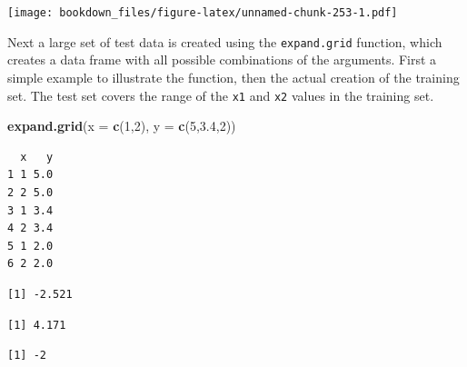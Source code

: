 \documentclass[
]{krantz}
\makeatletter
\newenvironment{Shaded}{\begin{snugshade}}{\end{snugshade}}
\newcommand{\DataTypeTok}[1]{\textcolor[rgb]{0.27,0.27,0.27}{#1}}
\newcommand{\DecValTok}[1]{\textcolor[rgb]{0.06,0.06,0.06}{#1}}
\newcommand{\FloatTok}[1]{\textcolor[rgb]{0.06,0.06,0.06}{#1}}
\newcommand{\KeywordTok}[1]{\textcolor[rgb]{0.27,0.27,0.27}{\textbf{#1}}}
\newcommand{\NormalTok}[1]{#1}
\newcommand{\OperatorTok}[1]{\textcolor[rgb]{0.43,0.43,0.43}{\textbf{#1}}}
\newenvironment{kframe}{%
\medskip{}
\setlength{\fboxsep}{.8em}
 \def\at@end@of@kframe{}%
 \ifinner\ifhmode%
  \def\at@end@of@kframe{\end{minipage}}%
  \begin{minipage}{\columnwidth}%
 \fi\fi%
 \def\FrameCommand##1{\hskip\@totalleftmargin \hskip-\fboxsep
 \colorbox{shadecolor}{##1}\hskip-\fboxsep
     \hskip-\linewidth \hskip-\@totalleftmargin \hskip\columnwidth}%
 \MakeFramed {\advance\hsize-\width
   \@totalleftmargin\z@ \linewidth\hsize
   \@setminipage}}%
 {\par\unskip\endMakeFramed%
 \at@end@of@kframe}
\renewenvironment{Shaded}{\begin{kframe}}{\end{kframe}}
\makeatother
\begin{document}
\texttt{[image: bookdown\_files/figure-latex/unnamed-chunk-253-1.pdf]}

Next a large set of test data is created using the \texttt{expand.grid} function, which creates a data frame with all possible combinations of the arguments. First a simple example to illustrate the function, then the actual creation of the training set. The test set covers the range of the \texttt{x1} and \texttt{x2} values in the training set.

\begin{Shaded}
\begin{Highlighting}[]
\KeywordTok{expand.grid}\NormalTok{(}\DataTypeTok{x =} \KeywordTok{c}\NormalTok{(}\DecValTok{1}\NormalTok{,}\DecValTok{2}\NormalTok{), }\DataTypeTok{y =} \KeywordTok{c}\NormalTok{(}\DecValTok{5}\NormalTok{,}\FloatTok{3.4}\NormalTok{,}\DecValTok{2}\NormalTok{))}
\end{Highlighting}
\end{Shaded}

\begin{verbatim}
  x   y
1 1 5.0
2 2 5.0
3 1 3.4
4 2 3.4
5 1 2.0
6 2 2.0
\end{verbatim}

\begin{Shaded}
\end{Shaded}

\begin{verbatim}
[1] -2.521
\end{verbatim}

\begin{Shaded}
\end{Shaded}

\begin{verbatim}
[1] 4.171
\end{verbatim}

\begin{Shaded}
\end{Shaded}

\begin{verbatim}
[1] -2
\end{verbatim}
\end{document}
